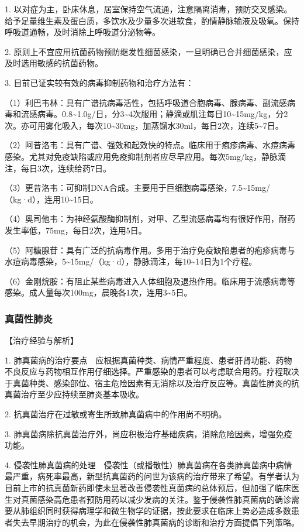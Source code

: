 1.
以对症为主，卧床休息，居室保持空气流通，注意隔离消毒，预防交叉感染。给予足量维生素及蛋白质，多饮水及少量多次进软食，酌情静脉输液及吸氧。保持呼吸道通畅，及时消除上呼吸道分泌物等。

2.
原则上不宜应用抗菌药物预防继发性细菌感染，一旦明确已合并细菌感染，应及时选用敏感的抗菌药物。

3. 目前已证实较有效的病毒抑制药物和治疗方法有：

（1）利巴韦林：具有广谱抗病毒活性，包括呼吸道合胞病毒、腺病毒、副流感病毒和流感病毒。0.8\textasciitilde{}1.0g/日，分3\textasciitilde{}4次服用；静滴或肌注每日10\textasciitilde{}15mg/kg，分2次。亦可用雾化吸入，每次10\textasciitilde{}30mg，加蒸馏水30ml，每日2次，连续5\textasciitilde{}7日。

（2）阿昔洛韦：具有广谱、强效和起效快的特点。临床用于疱疹病毒、水痘病毒感染。尤其对免疫缺陷或应用免疫抑制剂者应尽早应用。每次5mg/kg，静脉滴注，每日3次，连续给药7日。

（3）更昔洛韦：可抑制DNA合成。主要用于巨细胞病毒感染，7.5\textasciitilde{}15mg/（kg·d），连用10\textasciitilde{}15日。

（4）奥司他韦：为神经氨酸酶抑制剂，对甲、乙型流感病毒均有很好作用，耐药发生率低，75mg，每日2次，连用5日。

（5）阿糖腺苷：具有广泛的抗病毒作用。多用于治疗免疫缺陷患者的疱疹病毒与水痘病毒感染，5\textasciitilde{}15mg/（kg·d），静脉滴注，每10\textasciitilde{}14日为1个疗程。

（6）金刚烷胺：有阻止某些病毒进入人体细胞及退热作用。临床用于流感病毒等感染。成人量每次100mg，晨晚各1次，连用3\textasciitilde{}5日。

\subsubsection{真菌性肺炎}

【治疗经验与解析】

1.
肺真菌病的治疗要点　应根据真菌种类、病情严重程度、患者肝肾功能、药物不良反应与药物相互作用仔细选择。严重感染的患者可以考虑联合用药。疗程取决于真菌种类、感染部位、宿主危险因素有无消除以及治疗反应等。真菌性肺炎的抗真菌治疗至少应持续至肺炎基本吸收。

2. 抗真菌治疗在过敏或寄生所致肺真菌病中的作用尚不明确。

3.
肺真菌病除抗真菌治疗外，尚应积极治疗基础疾病，消除危险因素，增强免疫功能。

4.
侵袭性肺真菌病的处理　侵袭性（或播散性）肺真菌病在各类肺真菌病中病情最严重，病死率最高，新型抗真菌药的问世为该病的治疗带来了希望。有学者认为目前上市的抗真菌新药即使未显著改善侵袭性真菌病的总体预后，但加强了临床医生对真菌感染高危患者预防用药以减少发病的关注。鉴于侵袭性肺真菌病的确诊需要从肺组织同时获得病理学和微生物学的证据，按此要求在临床上势必造成多数患者失去早期治疗的机会，为此在侵袭性肺真菌病的诊断和治疗方面提倡下列策略。

